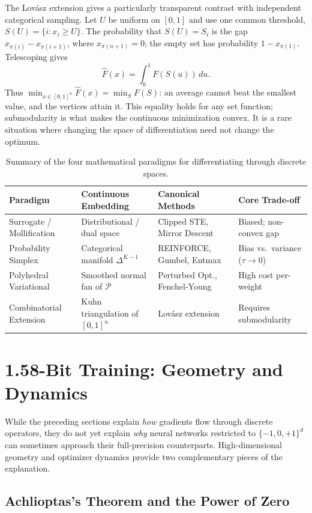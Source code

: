 The Lov\'asz extension gives a particularly transparent contrast with independent categorical sampling. Let $U$ be uniform on $[0,1]$ and use one common threshold, $S(U)=\{i:x_i\geq U\}$. The probability that $S(U)=S_i$ is the gap $x_{\pi(i)}-x_{\pi(i+1)}$, where $x_{\pi(n+1)}=0$; the empty set has probability $1-x_{\pi(1)}$. Telescoping gives
\[
 \widehat F(x)=\int_0^1 F(S(u))\,du.
\]
Thus $\min_{x\in[0,1]^n}\widehat F(x)=\min_S F(S)$: an average cannot beat the smallest value, and the vertices attain it. This equality holds for any set function; submodularity is what makes the continuous minimization convex. It is a rare situation where changing the space of differentiation need not change the optimum.

\begin{table}[htbp]
\centering
\small
\begin{tabularx}{\linewidth}{@{}YYYY@{}}
\toprule
\textbf{Paradigm} & \textbf{Continuous Embedding} & \textbf{Canonical Methods} & \textbf{Core Trade-off} \\
\midrule
Surrogate / Mollification & Distributional / dual space & Clipped STE, Mirror Descent & Biased; non-convex gap \\
Probability Simplex & Categorical manifold $\Delta^{K-1}$ & REINFORCE, Gumbel, Entmax & Bias vs.\ variance ($\tau \to 0$) \\
Polyhedral Variational & Smoothed normal fan of $\mathcal{P}$ & Perturbed Opt., Fenchel-Young & High cost per-weight \\
Combinatorial Extension & Kuhn triangulation of $[0,1]^n$ & Lovász extension & Requires submodularity \\
\bottomrule
\end{tabularx}
\caption{Summary of the four mathematical paradigms for differentiating through discrete spaces.}
\end{table}

\section{1.58-Bit Training: Geometry and Dynamics}

While the preceding sections explain \emph{how} gradients flow through discrete operators, they do not yet explain \emph{why} neural networks restricted to $\{-1, 0, +1\}^d$ can sometimes approach their full-precision counterparts. High-dimensional geometry and optimizer dynamics provide two complementary pieces of the explanation.

\subsection{Achlioptas's Theorem and the Power of Zero}

